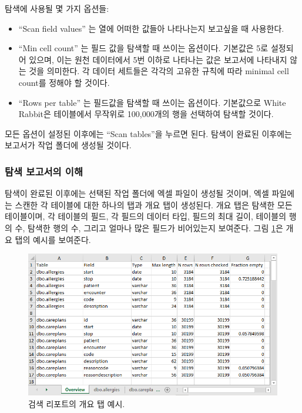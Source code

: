 \documentclass[11pt]{book}
\providecommand{\tightlist}{%
  \setlength{\itemsep}{0pt}\setlength{\parskip}{0pt}}
\theoremstyle{definition}
\theoremstyle{definition}
\theoremstyle{definition}
\theoremstyle{remark}
\begin{document}
탐색에 사용될 몇 가지 옵션들:

\begin{itemize}
\tightlist
\item
  ``Scan field values'' 는 열에 어떠한 값들아 나타나는지 보고싶을 때
  사용한다.
\item
  ``Min cell count'' 는 필드 값을 탐색할 때 쓰이는 옵션이다. 기본값은
  5로 설정되어 있으며, 이는 원천 데이터에서 5번 이하로 나타나는 값은
  보고서에 나타내지 않는 것을 의미한다. 각 데이터 세트들은 각각의 고유한
  규칙에 따라 minimal cell count를 정해야 할 것이다.
\item
  ``Rows per table'' 는 필드값을 탐색할 때 쓰이는 옵션이다. 기본값으로
  White Rabbit은 테이블에서 무작위로 100,000개의 행을 선택하여 탐색할
  것이다.
\end{itemize}

모든 옵션이 설정된 이후에는 ``Scan tables''을 누르면 된다. 탐색이 완료된
이후에는 보고서가 작업 폴더에 생성될 것이다.

\subsubsection*{탐색 보고서의 이해}\label{--}

탐색이 완료된 이후에는 선택된 작업 폴더에 엑셀 파일이 생성될 것이며,
엑셀 파일에는 스캔한 각 테이블에 대한 하나의 탭과 개요 탭이 생성된다.
개요 탭은 탐색한 모든 테이블이며, 각 테이블의 필드, 각 필드의 데이터
타입, 필드의 최대 길이, 테이블의 행의 수, 탐색한 행의 수, 그리고 얼마나
많은 필드가 비어있는지 보여준다. 그림 \ref{fig:ScanOverviewTab}은 개요
탭의 예시를 보여준다.

\begin{figure}

{\centering \includegraphics[width=1\linewidth]{images/ExtractTransformLoad/ScanOverviewTab} 

}

\caption{검색 리포트의 개요 탭 예시.}\label{fig:ScanOverviewTab}
\end{figure}
\end{document}
